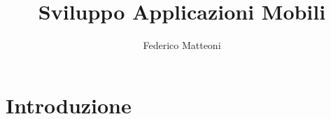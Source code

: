 \documentclass[10pt]{book}
\begin{document}
\renewcommand*\contentsname{Indice}
\title{Sviluppo Applicazioni Mobili}
\author{Federico Matteoni}
\date{ }
\maketitle
\tableofcontents
\pagebreak
\section*{Introduzione}
\end{document}
